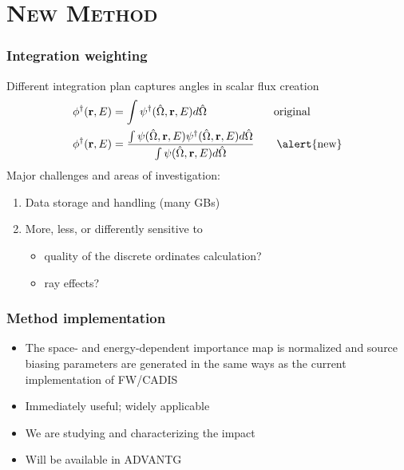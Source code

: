 \documentclass[handout]{beamer}
\renewcommand{\(}{\begin{columns}}
\renewcommand{\)}{\end{columns}}
\newcommand{\<}[1]{\begin{column}{#1}}
\renewcommand{\>}{\end{column}}
\newcommand{\vOmega}{\ensuremath{\hat{\Omega}}}
\newcommand{\ve}[1]{\ensuremath{\mathbf{#1}}}
\begin{document}
\section{\scshape New Method}
\begin{frame}[fragile]
  \frametitle{Integration weighting}

    Different integration plan captures angles in scalar flux creation	
	\begin{align*}
		\phi^{\dagger}(\ve{r},E) &= \int \psi^{\dagger}(\vOmega, 
		\ve{r},E) d\vOmega \qquad  \qquad \qquad \text{original}\\
		\phi^{\dagger}(\ve{r},E) &= \frac{\int \psi(\vOmega, \ve{r},E)
		 \psi^{\dagger}(\vOmega, \ve{r},E) d\vOmega}{\int \psi(\vOmega, 
		 \ve{r},E)  d\vOmega} \qquad \text{\alert{new}}
	\end{align*}
    \pause
    Major challenges and areas of investigation:
	\begin{enumerate}
	\item Data storage and handling (many GBs)
	\item More, less, or differently sensitive to 
	  \begin{itemize}
	  \item quality of the discrete ordinates calculation?
	  \item ray effects?
	  \end{itemize}
	\end{enumerate}

\end{frame}


\begin{frame}[fragile]
  \frametitle{Method implementation}

  	\begin{itemize}
    \item The space- and energy-dependent importance map is normalized and 
     source biasing parameters are generated in the \alert{same ways} as
     the current implementation of FW/CADIS \vspace*{1 em}
	\item Immediately useful; widely applicable \vspace*{1 em}
	\item We are studying and characterizing the impact\vspace*{1 em}
	\item Will be available in ADVANTG \cite{Pantelias2013}
	\end{itemize}
	
\end{frame}
\end{document}
